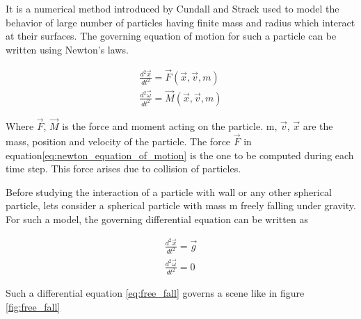It is a numerical method introduced by Cundall and Strack \citep{CS79}
used to model the behavior of large number of particles having finite
mass and radius which interact at their surfaces. The governing
equation of motion for such a particle can be written using Newton's
laws.

\begin{align}
  \label{eq:newton_equation_of_motion}
  \frac{d^2 \vec{x}}{dt^2} = \vec{F}(\vec{x}, \vec{v}, m)\\
  \frac{d^2 \vec{\omega}}{dt^2} = \vec{M}(\vec{x}, \vec{v}, m)
\end{align}

Where $\vec{F}$, $\vec{M}$ is the force and moment acting on the
particle. m, $\vec{v}$, $\vec{x}$ are the mass, position and velocity
of the particle.
The force $\vec{F}$ in equation\ref{eq:newton_equation_of_motion} is
the one to be computed during each time step. This force arises due to
collision of particles.


Before studying the interaction of a particle with wall or any other
spherical particle, lets consider a spherical particle with mass m
freely falling under gravity. For such a model, the governing
differential equation can be written as

\begin{align}
  \label{eq:free_fall}
  \frac{d^2 \vec{x}}{dt^2} = \vec{g}\\
  \frac{d^2 \vec{\omega}}{dt^2} = 0
\end{align}

Such a differential equation \eqref{eq:free_fall} governs a scene like
in figure \eqref{fig:free_fall}

